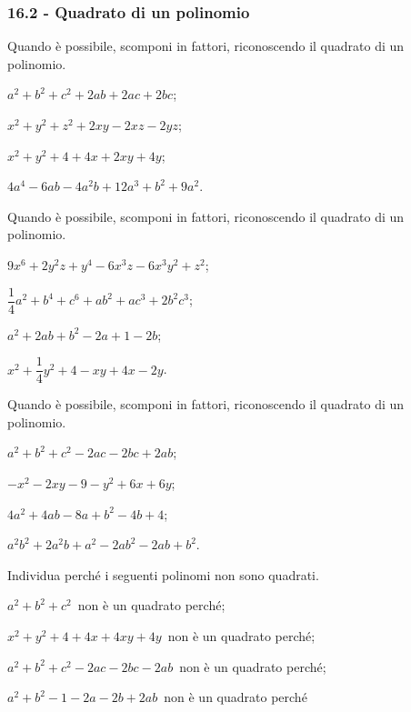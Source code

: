 \subsubsection*{16.2 - Quadrato di un polinomio}
\begin{multicols}{2}
\begin{esercizio}
\label{ese:16.13}
Quando è possibile, scomponi in fattori, riconoscendo il quadrato di un polinomio.
\begin{enumeratea}
 \item $a^{2}+b^{2}+c^{2}+2ab+2ac+2bc$;
 \item $x^{2}+y^{2}+z^{2}+2xy-2xz-2yz$;
 \item $x^{2}+y^{2}+4+4x+2xy+4y$;
 \item $4a^{4}-6{ab}-4a^{2}b+12a^{3}+b^{2}+9a^{2}$.
\end{enumeratea}
\end{esercizio}

\begin{esercizio}
Quando è possibile, scomponi in fattori, riconoscendo il quadrato di un polinomio.
\label{ese:16.14}
\begin{enumeratea}
 \item $9x^{6}+2y^{2}z+y^{4}-6x^{3}z-6x^{3}y^{2}+z^{2}$;
 \item $\dfrac{1}{4}a^{2}+b^{4}+c^{6}+ab^{2}+{ac}^{3}+2b^{2}c^{3}$;
 \item $a^{2}+2ab+b^{2}-2a+1-2b$;
 \item $x^{2}+\dfrac{1}{4}y^{2}+4-xy+4x-2y$.
\end{enumeratea}
\end{esercizio}

\begin{esercizio}
\label{ese:16.15}
Quando è possibile, scomponi in fattori, riconoscendo il quadrato di un polinomio.
\begin{enumeratea}
 \item $a^{2}+b^{2}+c^{2}-2ac-2bc+2ab$;
 \item $-x^{2}-2xy-9-y^{2}+6x+6y$;
 \item $4a^{2}+4ab-8a+b^{2}-4b+4$;
 \item $a^{2}b^{2}+2a^{2}b+a^{2}-2ab^{2}-2ab+b^{2}$.
\end{enumeratea}
\end{esercizio}
\end{multicols}
\begin{esercizio}
Individua perché i seguenti polinomi non sono quadrati.
\label{ese:16.16}
\begin{enumeratea}
 \item $a^{2}+b^{2}+c^{2}$\, non è un quadrato perché\dotfill;
 \item $x^{2}+y^{2}+4+4x+4xy+4y$\, non è un quadrato perché\dotfill;
 \item $a^{2}+b^{2}+c^{2}-2ac-2bc-2ab$\, non è un quadrato perché\dotfill;
 \item $a^{2}+b^{2}-1-2a-2b+2ab$\, non è un quadrato perché\dotfill
\end{enumeratea}
\end{esercizio}

